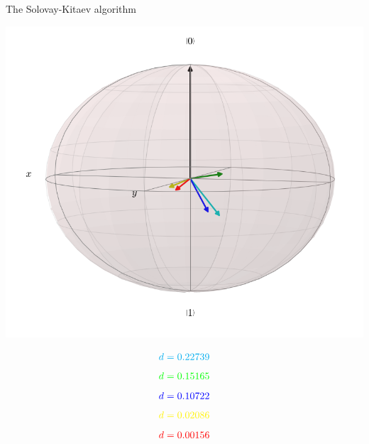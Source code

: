 \documentclass[10pt]{beamer}
\begin{document}
{
\begin{frame}{The Solovay-Kitaev algorithm}

\begin{minipage}[c]{.8\textwidth}
	\includegraphics[height=0.8\textwidth]{fowlerdistance.png}
       \captionsetup{justification=raggedright, singlelinecheck=false}
\end{minipage}%
\begin{minipage}[c]{.2\textwidth}
\scriptsize
\begin{equation}
\textcolor{cyan}{d = 0.22739}
\end{equation}
\begin{equation}
\textcolor{green}{d = 0.15165}
\end{equation}
\begin{equation}
\textcolor{blue}{d = 0.10722}
\end{equation}
\begin{equation}
\textcolor{yellow}{d = 0.02086}
\end{equation}
\begin{equation}
\textcolor{red}{d = 0.00156}
\end{equation}

\end{minipage}

\end{frame}
}
\end{document}
